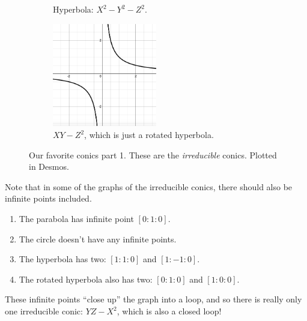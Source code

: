 \documentclass[12pt]{article}
\newcommand{\ita}[1]{\textit{#1}}
\theoremstyle{definition}
\begin{document}
\begin{figure}[H]
\begin{subfigure}{0.5\textwidth}
        \caption{Hyperbola: $X^2-Y^2-Z^2$.}
        \label{fig:subim2}
    \end{subfigure}
    \hfill
    \begin{subfigure}{0.5\textwidth}
        \centering
        \includegraphics[width=0.5\textwidth]{39.png}
        \caption{$XY-Z^2$, which is just a rotated hyperbola.}
        \label{fig:subim2}
    \end{subfigure}

    \caption{Our favorite conics part 1. These are the \ita{irreducible} conics. Plotted in Desmos.}
\end{figure}
Note that in some of the graphs of the irreducible conics, there should also be infinite points included. 
\begin{enumerate}
    \item The parabola has infinite point $[0:1:0]$.
    \item The circle doesn't have any infinite points.
    \item The hyperbola has two: $[1:1:0]$ and $[1:-1:0]$.
    \item The rotated hyperbola also has two: $[0:1:0]$ and $[1:0:0]$.
\end{enumerate}
These infinite points ``close up'' the graph into a loop, and so there is really only one irreducible conic: $YZ-X^2$, which is also a closed loop!
\end{document}
